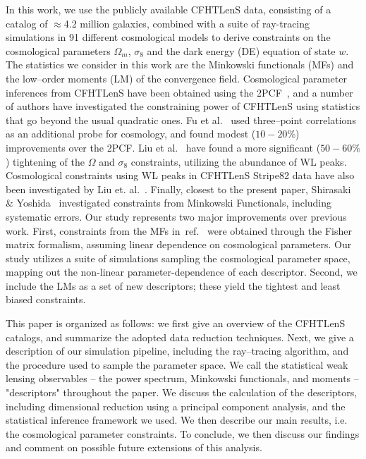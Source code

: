 \documentclass[reprint,aps,prd,superscriptaddress,showkeys,showpacs]{revtex4-1}
\begin{document}
In this work, we use the publicly available CFHTLenS data, consisting
of a catalog of $\approx$4.2 million galaxies, combined with a suite
of ray-tracing simulations in 91 different cosmological models to
derive constraints on the cosmological parameters $\Omega_m$,
$\sigma_8$ and the dark energy (DE) equation of state $w$.  The
statistics we consider in this work are the Minkowski functionals
(MFs) and the low--order moments (LM) of the convergence field.
Cosmological parameter inferences from CFHTLenS have been obtained
using the 2PCF~\citep{CFHTKilbinger}, and a number of authors have
investigated the constraining power of CFHTLenS using statistics that
go beyond the usual quadratic ones. Fu et al.~\citep{CFHTFu} used
three--point correlations as an additional probe for cosmology, and
found modest ($10-20\%$) improvements over the 2PCF.  Liu et
al.~\citep{Companion} have found a more significant ($50-60\%$)
tightening of the $\Omega$ and $\sigma_8$ constraints, utilizing the
abundance of WL peaks. Cosmological constraints using WL peaks in CFHTLenS Stripe82 data
have also been investigated by Liu et. al.~\citep{Stripe82}. 
Finally, closest to the present paper, Shirasaki \&
Yoshida~\citep{CFHTMasato} investigated constraints from Minkowski
Functionals, including systematic errors.  Our study represents two
major improvements over previous work.  First, constraints from the
MFs in~ref.~\citep{CFHTMasato} were obtained through the Fisher matrix
formalism, assuming linear dependence on cosmological parameters. Our
study utilizes a suite of simulations sampling the cosmological
parameter space, mapping out the non-linear parameter-dependence of
each descriptor.  Second, we include the LMs as a set of new
descriptors; these yield the tightest and least biased constraints.


This paper is organized as follows: we first give an overview of the
CFHTLenS catalogs, and summarize the adopted data reduction
techniques. Next, we give a description of our simulation pipeline,
including the ray--tracing algorithm, and the procedure used to sample
the parameter space. We call the statistical weak lensing observables
-- the power spectrum, Minkowski functionals, and moments --
"descriptors" throughout the paper. We discuss the calculation of the
descriptors, including dimensional reduction using a principal
component analysis, and the statistical inference framework we
used. We then describe our main results, i.e. the cosmological
parameter constraints. To conclude, we then discuss our findings and
comment on possible future extensions of this analysis.
\end{document}
